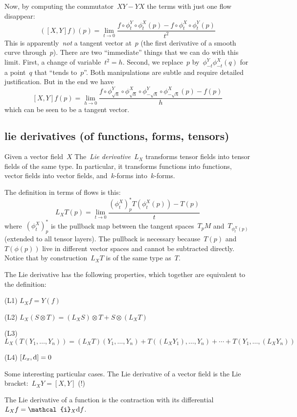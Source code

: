 Now, by computing the commutator~$XY-YX$ the terms with just one flow disappear:
\[
	([X,Y]f)(p) =
	\lim_{t\to0}\frac{
		f\circ\phi^Y_t\circ\phi^X_t(p)
		-
		f\circ\phi^X_t\circ\phi^Y_t(p)
	}{t^2}
\]
This is apparently~\emph{not} a tangent vector at~$p$ (the first derivative of a
smooth curve through~$p$).  There are two ``immediate'' things that we can do
with this limit.  First, a change of variable~$t^2=h$.  Second, we
replace~$p$ by~$\phi^Y_{-t}\phi^X_{-t}(q)$ for a point~$q$ that ``tends
to~$p$''.  Both manipulations are subtle and require detailed justification.
But in the end we have
\[
	[X,Y]f(p)=\lim_{h\to0}\frac{
		f\circ\phi^Y_{\sqrt h}\circ\phi^X_{\sqrt h}
		\circ\phi^Y_{-\sqrt h}\circ\phi^X_{-\sqrt h}(p)
		-f(p)
	}h
\]
which can be seen to be a tangent vector.



\subsection{lie derivatives (of functions, forms, tensors)}

Given a vector field~$X$ The~\emph{Lie derivative~$L_X$} transforms tensor
fields into tensor fields of the same type.  In particular, it transforms
functions into functions, vector fields into vector fields, and~$k$-forms
into~$k$-forms.

The definition in terms of flows is this:
\[
	L_X T(p)=\lim_{t\to0}\frac{\left(\phi^X_t\right)^*_pT\left(\phi^X_t(p)\right)-T(p)}t
\]
where~$\left(\phi^X_t\right)^*_p$ is the pullback map between the
tangent spaces~$T_pM$ and~$T_{\phi^X_t(p)}$ (extended to all tensor
layers).  The pullback is necessary because~$T(p)$ and~$T(\phi(p))$ live in
different vector spaces and cannot be subtracted directly.  Notice that by
construction~$L_XT$ is of the same type as~$T$.

The Lie derivative has the following properties, which together are
equivalent to the definition:

(L1) $L_Xf=Y(f)$

(L2) $L_X(S\otimes T)=(L_XS)\otimes T+S\otimes(L_XT)$

(L3) $L_X(T(Y_1,\ldots,Y_n))
=
(L_XT)(Y_1,\ldots,Y_n)
+T((L_XY_1),\ldots,Y_n)
+\cdots
+T(Y_1,\ldots,(L_XY_n))
$

(L4) $[L_x,\mathrm{d}]=0$


Some interesting particular cases. The Lie derivative of a vector field is
the Lie bracket:~$L_XY=[X,Y]$ (!)

The Lie derivative of a function is the contraction with its differential
\(L_Xf=\mathcal{i}_X\ud f\).

